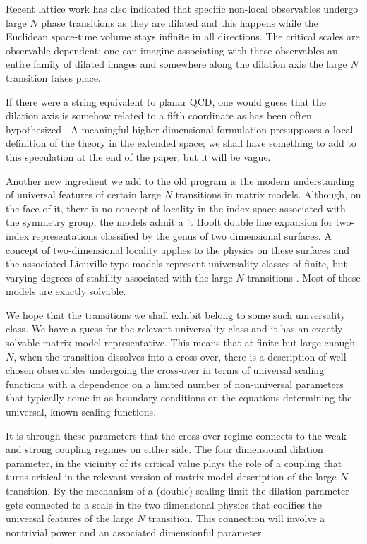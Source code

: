 Recent lattice work has also indicated that
specific non-local observables undergo large
$N$ phase transitions as they are dilated \cite{bulk2,knn} and this
happens while the Euclidean space-time volume stays infinite in
all directions. The critical scales are observable dependent; one
can imagine associating with these observables an entire family of
dilated images and somewhere along the dilation axis the large $N$
transition takes place.

If there were a string equivalent to
planar QCD, one would guess that the dilation axis is somehow
related to a fifth coordinate as has been often hypothesized
\cite{poly3,malda4}. A meaningful higher dimensional formulation
presupposes a local definition of the theory in the extended
space; we shall have something to add to this speculation at the
end of the paper, but it will be vague.

Another new ingredient we add to the old program is the modern
understanding of universal features of certain large $N$
transitions in matrix models. Although, on the face of it, there
is no concept of locality in the index space associated with the
symmetry group, the models admit a
't Hooft double line expansion for two-index representations
classified by the genus of two
dimensional surfaces. A concept of two-dimensional locality
applies to the physics on these surfaces and the associated
Liouville type models represent universality classes of finite,
but varying degrees of stability associated with the large $N$
transitions \cite{doublesca5}. Most of these models are exactly
solvable.

We hope that the transitions we shall exhibit belong to some such
universality class. We have a guess for the relevant universality
class and it has an exactly solvable matrix model representative.
This means that at finite but large enough
$N$, when the transition dissolves into a cross-over, there is a
description of well chosen observables undergoing the cross-over
in terms of universal scaling functions with a dependence on a
limited number of non-universal parameters that typically come in
as boundary conditions on the equations determining the universal,
known scaling functions.

It is through these parameters that the
cross-over regime connects to the weak and strong coupling regimes
on either side. The four dimensional dilation parameter, in the
vicinity of its critical value plays the role of a
coupling that turns critical in the relevant version of matrix model
description of the large $N$ transition. By the mechanism of a
(double) scaling limit the dilation parameter
gets connected to a scale in
the two dimensional physics that codifies the universal features
of the large $N$ transition. This connection will involve a
nontrivial power and an associated dimensionful parameter.

